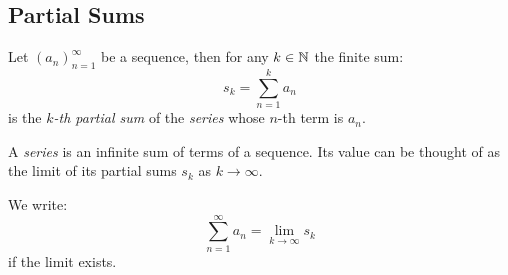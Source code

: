 \documentclass[../main.tex]{subfiles}
\begin{document}
\subsection{Partial Sums}
\begin{definition}
Let $(a_n)_{n = 1}^\infty$ be a sequence, then for any $k \in \mathbb{N}$ the finite sum:
\[
  s_k = \sum_{n = 1}^{k} a_n
\]
is the \textit{$k$-th partial sum} of the \textit{series} whose $n$-th term is $a_n$.
\end{definition}
\begin{definition}[Series]
A \textit{series} is an infinite sum of terms of a sequence. Its value can be thought of as the limit of its partial sums $s_k$ as $k \to \infty$.

We write:
\[
  \sum_{n=1}^{\infty} a_n = \lim_{k \to \infty} s_k
\]
if the limit exists.
\end{definition}
\end{document}
